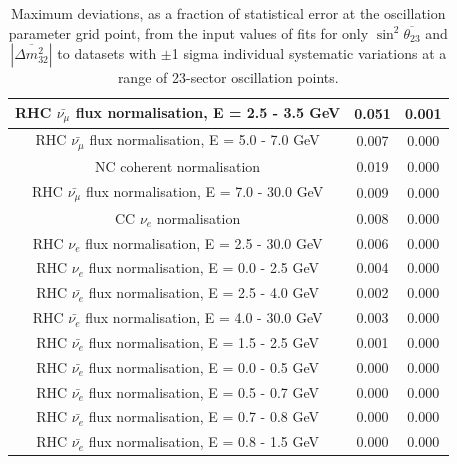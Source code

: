\begin{table}
\begin{tabular}{| c | c | c |}
                                      RHC $\bar{\nu_\mu}$ flux normalisation, E = 2.5 - 3.5 GeV & 0.051 & 0.001 \\ \hline 
                                      RHC $\bar{\nu_\mu}$ flux normalisation, E = 5.0 - 7.0 GeV & 0.007 & 0.000 \\ \hline 
                                                                      NC coherent normalisation & 0.019 & 0.000 \\ \hline 
                                     RHC $\bar{\nu_\mu}$ flux normalisation, E = 7.0 - 30.0 GeV & 0.009 & 0.000 \\ \hline 
                                                                     CC $\nu_{e}$ normalisation & 0.008 & 0.000 \\ \hline 
                                             RHC $\nu_e$ flux normalisation, E = 2.5 - 30.0 GeV & 0.006 & 0.000 \\ \hline 
                                              RHC $\nu_e$ flux normalisation, E = 0.0 - 2.5 GeV & 0.004 & 0.000 \\ \hline 
                                        RHC $\bar{\nu_e}$ flux normalisation, E = 2.5 - 4.0 GeV & 0.002 & 0.000 \\ \hline 
                                       RHC $\bar{\nu_e}$ flux normalisation, E = 4.0 - 30.0 GeV & 0.003 & 0.000 \\ \hline 
                                        RHC $\bar{\nu_e}$ flux normalisation, E = 1.5 - 2.5 GeV & 0.001 & 0.000 \\ \hline 
                                        RHC $\bar{\nu_e}$ flux normalisation, E = 0.0 - 0.5 GeV & 0.000 & 0.000 \\ \hline 
                                        RHC $\bar{\nu_e}$ flux normalisation, E = 0.5 - 0.7 GeV & 0.000 & 0.000 \\ \hline 
                                        RHC $\bar{\nu_e}$ flux normalisation, E = 0.7 - 0.8 GeV & 0.000 & 0.000 \\ \hline 
                                        RHC $\bar{\nu_e}$ flux normalisation, E = 0.8 - 1.5 GeV & 0.000 & 0.000 \\ \hline 
\hline
\end{tabular}
\caption{
  Maximum deviations, as a fraction of statistical error at the oscillation
  parameter grid point, from the input values of fits for only $\sin^2\overline{\theta_{23}}$ and $|\overline{\Delta m^2_{32}}|$ to datasets with 
  $\pm$1 sigma individual systematic variations at a range of 23-sector oscillation points.
}
\end{table}
